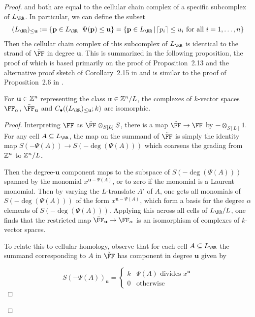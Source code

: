 \documentclass{amsart}
\begin{document}
\begin{proof}


 and both are equal to the cellular chain complex of a specific subcomplex of $L_{\RR}$. In particular, we can define the subset
\[(L_{\RR})_{\leq \mathbf{u}}:= \{\mathbf{p}\in L_{\RR} \,|\, \Psi(\mathbf{p})\leq \mathbf{u}\} = \{\mathbf{p}\in L_{\RR} \,|\, \lceil p_i\rceil \leq u_i\text{ for all } i=1,\ldots,n\}\]
Then the cellular chain complex of this subcomplex of $L_{\RR}$ is identical to the strand of $\tilde \FF$ in degree $\mathbf{u}$. This is summarized in the following proposition, the proof of which is based primarily on the proof of Proposition~2.13 and the alternative proof sketch of Corollary~2.15 in \cite{BCHSY} and is similar to the proof of Proposition~2.6 in \cite{BH25}.

\begin{prop}
  \label{prop:hhlStrands}
  For $\mathbf{u}\in \mathbb Z^n$ representing the class $\alpha\in \mathbb Z^n/L$, the complexes of $k$-vector spaces $\FF_{\alpha}$, $\tilde \FF_{\mathbf{u}}$ and $C_\bullet((L_{\RR})_{\leq \mathbf{u}};k)$ are isomorphic.
\end{prop}
\begin{proof}
  Interpreting $\FF$ as $\tilde \FF \otimes_{S[L]}S$, there is a map $\tilde \FF \rightarrow \FF$ by $-\otimes_{S[L]}1$. For any cell $A\subseteq L_{\RR}$, the map on the summand of $\tilde \FF$ is simply the identity map $S(-\Psi(A))\rightarrow S(-\deg(\Psi(A)))$ which coarsens the grading from $\mathbb Z^n$ to $\mathbb Z^n/L$.

  Then the degree-$\mathbf{u}$ component maps to the subspace of $S(-\deg(\Psi(A)))$ spanned by the monomial $x^{\mathbf{u}-\Psi(A)}$, or to zero if the monomial is a Laurent monomial.
  Then by varying the $L$-translate $A'$ of $A$, one gets all monomials of $S(-\deg(\Psi(A)))$ of the form $x^{\mathbf{u}-\Psi(A)}$, which form a basis for the degree $\alpha$ elements of $S(-\deg(\Psi(A)))$. Applying this across all cells of $L_{\RR}/L$, one finds that the restricted map $\tilde \FF_{\mathbf{u}}\rightarrow \FF_{\alpha}$ is an isomorphism of complexes of $k$-vector spaces.
  
  To relate this to cellular homology, observe that for each cell $A\subseteq L_{\RR}$ the summand corresponding to $A$ in $\tilde \FF$ has component in degree $\mathbf{u}$ given by

  \[S(-\Psi(A))_{\mathbf{u}} =
  \begin{cases}
    k & \Psi(A)\text{ divides } x^{\mathbf{u}}\\
    0 & \text{otherwise}
  \end{cases}\]


\end{proof}
\end{proof}
\end{document}

